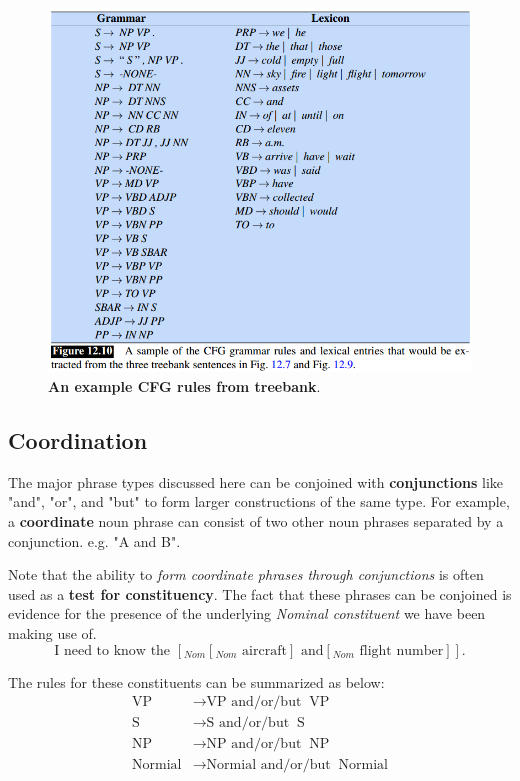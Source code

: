 \documentclass[11pt]{article}
\begin{document}
\begin{figure}
\begin{minipage}[t]{1\linewidth}
  \centering
  \centerline{\includegraphics[scale = 0.5]{CFG_rules_treebank.png}}
\end{minipage}
\caption{\footnotesize{\textbf{An example CFG rules from treebank}.}}
\label{fig: parse_tree2}
\end{figure}

\subsection{Coordination}
The major phrase types discussed here can be conjoined with \textbf{conjunctions} like "and", "or", and "but" to form larger constructions of the same type. For example, a \textbf{coordinate} noun phrase can consist of two other noun phrases separated by a conjunction. e.g. "A and B". 

Note that the ability to \emph{form coordinate phrases through conjunctions} is often used as a \textbf{test for constituency}. The fact that these phrases can be conjoined is evidence for the presence of the underlying \emph{Nominal constituent} we have been making use of. $$\text{I need to know the }[_{Nom} [_{Nom}\text{ aircraft}]\text{ and} [_{Nom}\text{ flight number}]].$$

The rules for these constituents can be summarized as below:
\begin{align*}
\text{VP} &\rightarrow \text{VP}\,\,\text{and/or/but}\;\;\text{VP}\\
\text{S} &\rightarrow \text{S}\,\,\text{and/or/but}\;\;\text{S}\\
\text{NP} &\rightarrow \text{NP}\,\,\text{and/or/but}\;\;\text{NP}\\
\text{Normial} &\rightarrow \text{Normial}\,\,\text{and/or/but}\;\;\text{Normial}
\end{align*}
\end{document}
